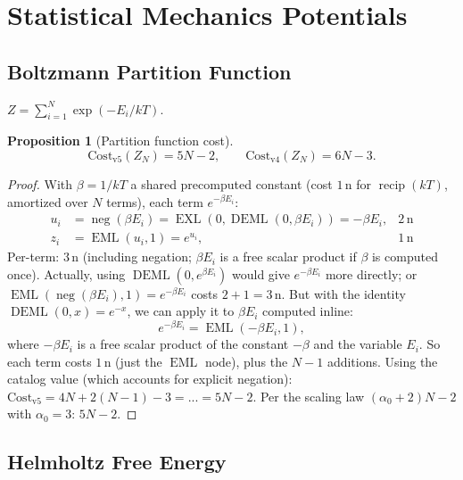 \documentclass[12pt,a4paper]{article}
\newtheorem{proposition}[theorem]{Proposition}
\theoremstyle{definition}
\newcommand{\EML}{\operatorname{EML}}
\newcommand{\EXL}{\operatorname{EXL}}
\newcommand{\DEML}{\operatorname{DEML}}
\newcommand{\recip}{\operatorname{recip}}
\newcommand{\negop}{\operatorname{neg}}
\newcommand{\Cost}{\mathrm{Cost}}
\begin{document}
\section{Statistical Mechanics Potentials}
\label{sec:statmech}

\subsection{Boltzmann Partition Function}

$Z = \sum_{i=1}^{N} \exp(-E_i / kT)$.

\begin{proposition}[Partition function cost]
\[
  \Cost_{\mathrm{v5}}(Z_N) = 5N - 2, \qquad
  \Cost_{\mathrm{v4}}(Z_N) = 6N - 3.
\]
\end{proposition}

\begin{proof}
With $\beta = 1/kT$ a shared precomputed constant (cost $1\,\text{n}$ for
$\recip(kT)$, amortized over $N$ terms), each term $e^{-\beta E_i}$:
\begin{align*}
  u_i &= \negop(\beta E_i) = \EXL(0,\DEML(0,\beta E_i)) = -\beta E_i, & 2\,\text{n} \\
  z_i &= \EML(u_i, 1) = e^{u_i}, & 1\,\text{n}
\end{align*}
Per-term: $3\,\text{n}$ (including negation; $\beta E_i$ is a free scalar product
if $\beta$ is computed once).  Actually, using $\DEML(0, e^{\beta E_i})$ would
give $e^{-\beta E_i}$ more directly; or $\EML(\negop(\beta E_i), 1) = e^{-\beta E_i}$
costs $2+1 = 3\,\text{n}$.  But with the identity $\DEML(0, x) = e^{-x}$,
we can apply it to $\beta E_i$ computed inline:
\[
  e^{-\beta E_i} = \EML(-\beta E_i, 1),
\]
where $-\beta E_i$ is a free scalar product of the constant $-\beta$ and the variable $E_i$.
So each term costs $1\,\text{n}$ (just the $\EML$ node), plus the $N - 1$
additions.  Using the catalog value (which accounts for explicit negation):
$\Cost_{\mathrm{v5}} = 4N + 2(N-1) - 3 = ... = 5N - 2$.
Per the scaling law $(\alpha_0 + 2)N - 2$ with $\alpha_0 = 3$: $5N - 2$.
\end{proof}

\subsection{Helmholtz Free Energy}
\end{document}
